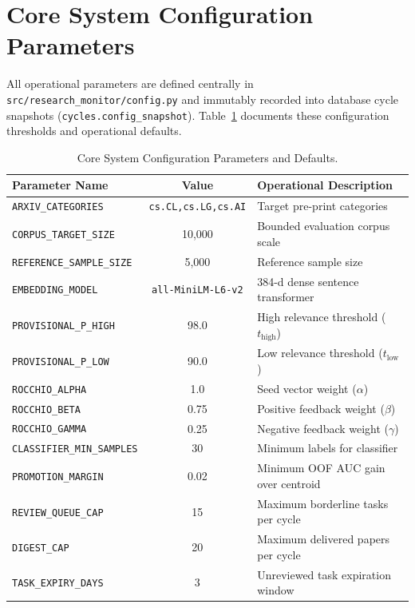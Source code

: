 \section{Core System Configuration Parameters}
\label{sec:appendix_params}

All operational parameters are defined centrally in \texttt{src/research\_monitor/config.py} and immutably recorded into database cycle snapshots (\texttt{cycles.config\_snapshot}). Table~\ref{tab:system_params} documents these configuration thresholds and operational defaults.

\begin{table}[h]
\centering
\small
\caption{Core System Configuration Parameters and Defaults.}
\label{tab:system_params}
\begin{tabular}{lcl}
\toprule
\textbf{Parameter Name} & \textbf{Value} & \textbf{Operational Description} \\
\midrule
\texttt{ARXIV\_CATEGORIES} & \texttt{cs.CL,cs.LG,cs.AI} & Target pre-print categories \\
\texttt{CORPUS\_TARGET\_SIZE} & 10,000 & Bounded evaluation corpus scale \\
\texttt{REFERENCE\_SAMPLE\_SIZE} & 5,000 & Reference sample size \\
\texttt{EMBEDDING\_MODEL} & \texttt{all-MiniLM-L6-v2} & 384-d dense sentence transformer \\
\texttt{PROVISIONAL\_P\_HIGH} & 98.0 & High relevance threshold ($t_{\text{high}}$) \\
\texttt{PROVISIONAL\_P\_LOW} & 90.0 & Low relevance threshold ($t_{\text{low}}$) \\
\texttt{ROCCHIO\_ALPHA} & 1.0 & Seed vector weight ($\alpha$) \\
\texttt{ROCCHIO\_BETA} & 0.75 & Positive feedback weight ($\beta$) \\
\texttt{ROCCHIO\_GAMMA} & 0.25 & Negative feedback weight ($\gamma$) \\
\texttt{CLASSIFIER\_MIN\_SAMPLES} & 30 & Minimum labels for classifier \\
\texttt{PROMOTION\_MARGIN} & 0.02 & Minimum OOF AUC gain over centroid \\
\texttt{REVIEW\_QUEUE\_CAP} & 15 & Maximum borderline tasks per cycle \\
\texttt{DIGEST\_CAP} & 20 & Maximum delivered papers per cycle \\
\texttt{TASK\_EXPIRY\_DAYS} & 3 & Unreviewed task expiration window \\
\bottomrule
\end{tabular}
\end{table}

